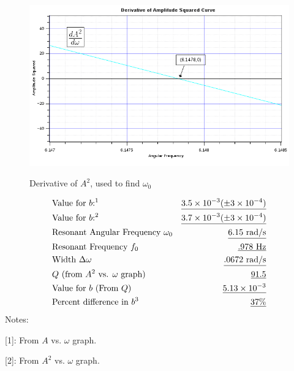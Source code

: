 \documentclass[twocolumn,english]{IEEEtran}
\theoremstyle{plain}
\theoremstyle{plain}
\begin{document}
\begin{figure}[h!]
  \begin{centering}
  \begin{center}
  \includegraphics[width=\linewidth]{./Images/PlotDerivative.png}
  \label{fig:graph_deriv}
  \caption{Derivative of $A^2$, used to find $\omega_0$}
  \end{center}
  \par\end{centering}
\end{figure}


\begin{align*}
 &\text{Value for $b$:\footnotemark[1]} 		&\text{\underline{$3.5\times 10^{-3} (\pm 3\times 10^{-4})$}} \\
 &\text{Value for $b$:\footnotemark[2]} 		&\text{\underline{$3.7\times 10^{-3} (\pm 3\times 10^{-4})$}} \\
 &\text{Resonant Angular Frequency $\omega_0$}			&\text{\underline{$6.15$ rad/s}} \\
 &\text{Resonant Frequency $f_0$}				&\text{\underline{$.978$ Hz}} \\
 &\text{Width $\Delta \omega$} 					&\text{\underline{.0672 rad/s}} \\
 &\text{$Q$ (from $A^2$ vs. $\omega$ graph)} 			&\text{\underline{91.5}} \\
 &\text{Value for $b$ (From $Q$)} 				&\text{\underline{$5.13\times 10^{-3}$}} \\
 &\text{Percent difference in $b$\footnotemark[3]} 				&\text{\underline{37\%}} \\
\end{align*}
Notes:

[1]: From $A$ vs. $\omega$ graph.

[2]: From $A^2$ vs. $\omega$ graph.
\end{document}
